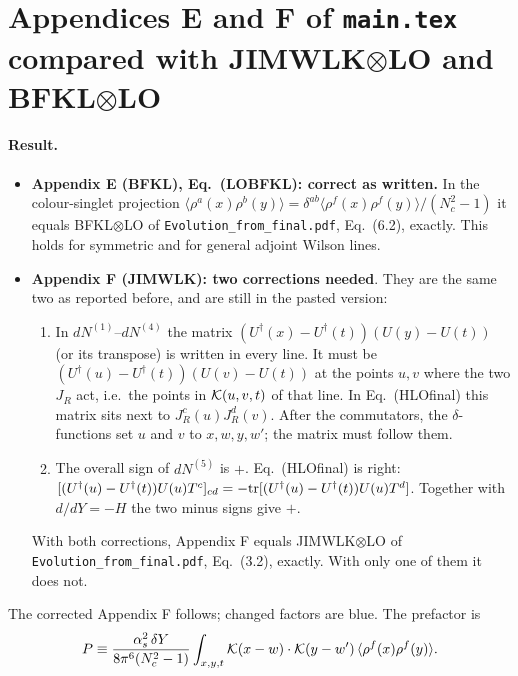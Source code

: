 \documentclass[10pt]{article}
\begin{document}
\section*{Appendices E and F of \texttt{main.tex} compared with JIMWLK$\otimes$LO and BFKL$\otimes$LO}

\paragraph{Result.}
\begin{itemize}
\item \textbf{Appendix E (BFKL), Eq.~(LOBFKL): correct as written.} In the colour-singlet projection $\langle\rho^a(x)\rho^b(y)\rangle=\delta^{ab}\langle\rho^f(x)\rho^f(y)\rangle/(N_c^2-1)$ it equals BFKL$\otimes$LO of \texttt{Evolution\_from\_final.pdf}, Eq.~(6.2), exactly. This holds for symmetric and for general adjoint Wilson lines.
\item \textbf{Appendix F (JIMWLK): two corrections needed}. They are the same two as reported before, and are still in the pasted version:
\begin{enumerate}
\item In $dN^{(1)}$--$dN^{(4)}$ the matrix $(U^\dagger(x)-U^\dagger(t))(U(y)-U(t))$ (or its transpose) is written in every line. It must be $(U^\dagger(u)-U^\dagger(t))(U(v)-U(t))$ at the points $u,v$ where the two $J_R$ act, i.e.\ the points in ${\cal K}(u,v,t)$ of that line. In Eq.~(HLOfinal) this matrix sits next to $J_R^c(u)J_R^d(v)$. After the commutators, the $\delta$-functions set $u$ and $v$ to $x,w,y,w'$; the matrix must follow them.
\item The overall sign of $dN^{(5)}$ is $+$. Eq.~(HLOfinal) is right: $[(U^\dagger(u)-U^\dagger(t))U(u)T^c]_{cd}=-{\rm tr}[(U^\dagger(u)-U^\dagger(t))U(u)T^d]$. Together with $d/dY=-H$ the two minus signs give $+$.
\end{enumerate}
With both corrections, Appendix F equals JIMWLK$\otimes$LO of \texttt{Evolution\_from\_final.pdf}, Eq.~(3.2), exactly. With only one of them it does not.
\end{itemize}
The corrected Appendix F follows; changed factors are blue. The prefactor is
\begin{equation*}
P\equiv\frac{\alpha_s^2\,\delta Y}{8\pi^6(N_c^2-1)}\int_{x,y,t}{\cal K}(x-w)\cdot{\cal K}(y-w')\,\langle\rho^f(x)\rho^f(y)\rangle .
\end{equation*}
\end{document}
